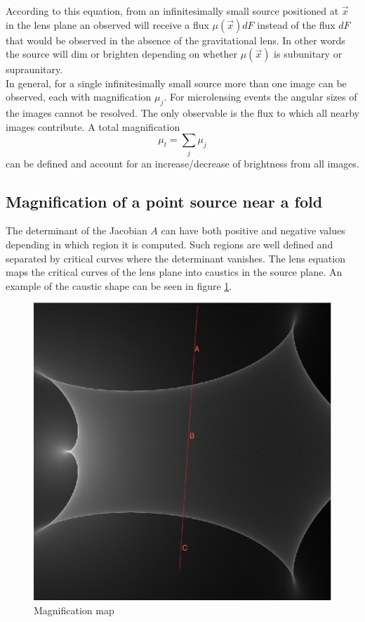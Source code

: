 According to this equation, from an infinitesimally small source positioned at $\vec{x}$ in the lens plane an observed will receive a flux $\mu(\vec{x}) dF$ instead of the flux $dF$ that would be
observed in the absence of the gravitational lens. In other words the source will dim or brighten depending on whether $\mu(\vec{x})$ is subunitary or supraunitary.\\

In general, for a single infinitesimally small source more than one image can be observed, each with magnification $\mu_j$. For microlensing events the angular sizes of the
images cannot be resolved. The only observable is the flux to which all nearby images contribute. A total magnification
\begin{equation}
 \mu_t = \sum_{j} \mu_j
\end{equation}
 can be defined and account for an increase/decrease of brightness from all images.


\subsection{Magnification of a point source near a fold}

The determinant of the Jacobian $A$ can have both positive and negative values depending in which region it is computed. Such regions are well defined and separated
by critical curves where the determinant vanishes. The lens equation maps the critical curves of the lens plane into caustics in the source plane. An example of the caustic 
shape can be seen in figure \ref{fig:magnification_map}.\\

\begin{figure}
\centering
  \includegraphics[width=0.49\hsize]{plots/IRIS567_path_2.eps}
\caption{\label{fig:magnification_map} Magnification map}
\end{figure}

